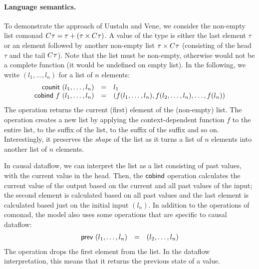 \paragraph{Language semantics.}
To demonstrate the approach of Uustalu and Vene, we consider the non-empty list comonad
$C^{}\tau = \tau + (\tau \times C^{}\tau)$. A value of the type is either
the last element $\tau$ or an element followed by another non-empty list $\tau \times C^{}\tau$
(consisting of the head $\tau$ and the tail $C^{}\tau$). Note that the list must be non-empty,
otherwise  would not be a complete function (it would be undefined on empty list). In
the following, we write $(l_1, \ldots, l_n)$ for a list of $n$ elements:
%
\begin{equation*}
\begin{array}{rcl}
\textnormal{\sffamily counit}~(l_1, \ldots, l_n) &=& l_1\\
\textnormal{\sffamily cobind}~f~(l_1, \ldots, l_n) &=& (f (l_1, \ldots, l_n), f (l_2, \ldots, l_n), \ldots, f (l_n))
\end{array}
\end{equation*}
%
The  operation returns the current (first) element of the (non-empty) list.
The  operation creates a new list by applying the context-dependent function $f$
to the entire list, to the suffix of the list, to the suffix of the suffix and so on. Interestingly,
it preserves the \emph{shape} of the list as it turns a list of $n$ elements into another list
of $n$ elements.

In causal dataflow, we can interpret the list as a list consisting of past values, with the
current value in the head. Then, the $\textnormal{\sffamily cobind}$ operation calculates the current value
of the output based on the current and all past values of the input; the second element is
calculated based on all past values and the last element is calculated based just on the initial
input $(l_n)$. In addition to the operations of comonad, the model also uses some operations that
are specific to causal dataflow:
%
\begin{equation*}
\begin{array}{rcl}
\textnormal{\sffamily prev}~(l_1, \ldots, l_n) &=& (l_2, \ldots, l_n)\\
\end{array}
\end{equation*}
%
The operation drops the first element from the list. In the dataflow interpretation, this means
that it returns the previous state of a value.

